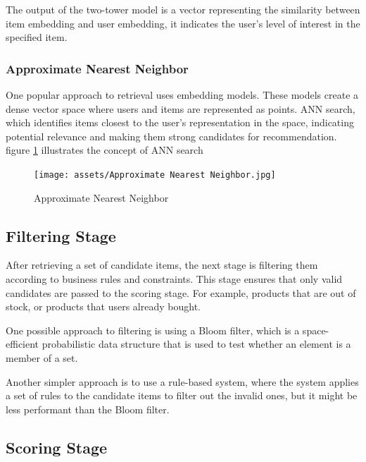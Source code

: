 The output of the two-tower model is a vector representing the similarity between item embedding and user embedding, 
it indicates the user's level of interest in the specified item.


\subsubsection{Approximate Nearest Neighbor}

One popular approach to retrieval uses embedding models. 
These models create a dense vector space where users and items are represented as points.
ANN search,
which identifies items closest to the user's representation in the space, 
indicating potential relevance and making them strong candidates for recommendation. figure \ref{fig:Ann} illustrates the concept of ANN search

\begin{figure}[H]
    \centering
    \texttt{[image: assets/Approximate Nearest Neighbor.jpg]}
    \caption[Approximate Nearest Neighbor]{Approximate Nearest Neighbor}
    \label{fig:Ann}
\end{figure}



\subsection{Filtering Stage}

After retrieving a set of candidate items, the next stage is filtering them according to business rules and constraints.
This stage ensures that only valid candidates are passed to the scoring stage.
For example, products that are out of stock, or products that users already bought.

One possible approach to filtering is using a Bloom filter, which is a space-efficient probabilistic data structure that is used to test whether an element is a member of a set.

Another simpler approach is to use a rule-based system, where the system applies a set of rules to the candidate items to filter out the invalid ones, but it might be less performant than the Bloom filter.


\subsection{Scoring Stage}

